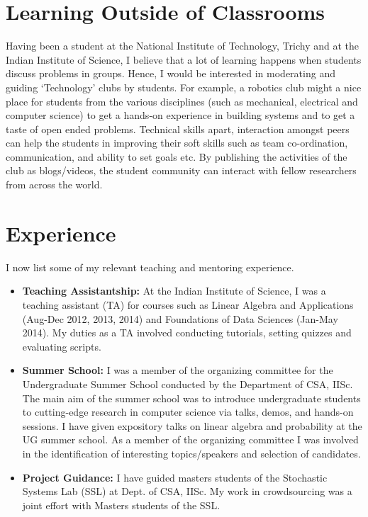 \documentclass[onecolumn,12pt]{IEEEtran}
\begin{document}
\section{Learning Outside of Classrooms}
Having been a student at the National Institute of Technology, Trichy and at the Indian Institute of Science, I believe that a lot of learning happens when students discuss problems in groups. Hence, I would be interested in moderating and guiding `Technology' clubs by students. For example, a robotics club might a nice place for students from the various disciplines (such as mechanical, electrical and computer science) to get a hands-on experience in building systems and to get a taste of open ended problems. Technical skills apart, interaction amongst peers can help the students in improving their soft skills such as team co-ordination, communication, and ability to set goals etc. By publishing the activities of the club as blogs/videos, the student community can interact with fellow researchers from across the world.
\section{Experience}
I now list some of my relevant teaching and mentoring experience.
\begin{itemize}
\item \textbf{Teaching Assistantship:} At the Indian Institute of Science, I was a teaching assistant (TA) for courses such as Linear Algebra and Applications (Aug-Dec 2012, 2013, 2014) and Foundations of Data Sciences (Jan-May 2014).  My duties as a TA involved conducting tutorials, setting quizzes and evaluating scripts.
\item \textbf{Summer School:} I  was a member of the organizing committee for the Undergraduate Summer School \cite{sschool} conducted by the Department of CSA, IISc. The main aim of the summer school was to introduce undergraduate students to cutting-edge research in computer science via  talks, demos, and hands-on sessions. I have given expository talks on linear algebra \cite{tube} and probability at the UG summer school. As a member of the organizing committee I was involved in the identification of interesting topics/speakers and selection of candidates.
\begin{comment}
\item \textbf{Research Presentations:} I have presented my research on internal forums such as the $53^{rd}$ IEEE Conference of Decision and Control held at Los Angeles, California USA, 2014 \cite{cdc} and the $29^{th}$ AAAI conference held at Austin, Texas USA, 2015 \cite{aaai}. I have also received awards for \emph{best research presentation} from Indian Institute of Space Technology, Trivandrum and Indian Institute of Science, Bangalore.
\end{comment}
\item \textbf{Project Guidance:} I have guided masters students of the Stochastic Systems Lab (SSL) at Dept. of CSA, IISc. My work in crowdsourcing \cite{hcomp} was a joint effort with Masters students of the SSL.
\end{itemize}


\end{document}
